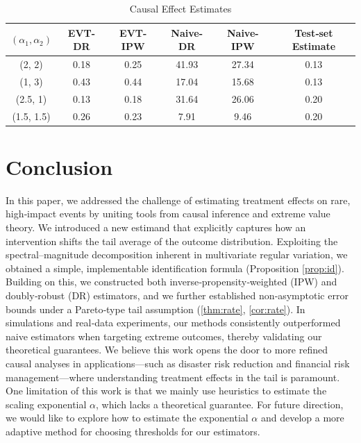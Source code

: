 \documentclass[12pt]{article}
\theoremstyle{plain}
\theoremstyle{definition}
\begin{document}
\begin{table}[!ht]
  \centering
  \caption{Causal Effect Estimates}
  \label{tab:semi-synthetic}
  \begin{tabular}{@{}cccccc@{}}
    \toprule
    $(\alpha_1, \alpha_2) $ & EVT-DR & EVT-IPW & Naive-DR  & Naive-IPW&  Test‐set Estimate \\
    \midrule
     (2, 2) & 0.18 &  0.25& 41.93  & 27.34  & 0.13 \\ 
     (1, 3) & 0.43 & 0.44 & 17.04 & 15.68  &0.13 \\
     (2.5, 1) & 0.13 & 0.18  & 31.64 & 26.06 & 0.20\\
     (1.5, 1.5) & 0.26 & 0.23 & 7.91 & 9.46  & 0.20\\
    \bottomrule
  \end{tabular}
\end{table}
 
\section{Conclusion}
In this paper, we addressed the challenge of estimating treatment effects on rare, high‐impact events by uniting tools from causal inference and extreme value theory. We introduced a new estimand that explicitly captures how an intervention shifts the tail average of the outcome distribution. Exploiting the spectral–magnitude decomposition inherent in multivariate regular variation, we obtained a simple, implementable identification formula (Proposition \ref{prop:id}). Building on this, we constructed both inverse‐propensity‐weighted (IPW) and doubly‐robust (DR) estimators, and we further established non‐asymptotic error bounds under a Pareto‐type tail assumption (\cref{thm:rate}, \cref{cor:rate}). In simulations and real‐data experiments, our methods consistently outperformed naive estimators when targeting extreme outcomes, thereby validating our theoretical guarantees. We believe this work opens the door to more refined causal analyses in applications—such as disaster risk reduction and financial risk management—where understanding treatment effects in the tail is paramount. One limitation of this work is that we mainly use heuristics to estimate the scaling exponential $\alpha $, which lacks a theoretical guarantee. For future direction, we would like to explore how to estimate the exponential $\alpha$ and develop a more adaptive method for choosing thresholds for our estimators. 



\end{document}
